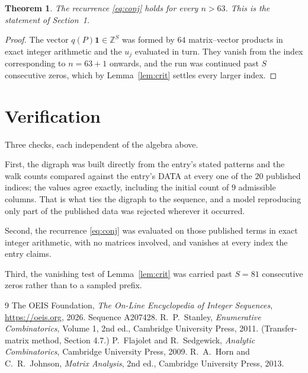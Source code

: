 \documentclass[11pt,a4paper]{article}
\theoremstyle{plain}
\newtheorem{theorem}{Theorem}
\theoremstyle{definition}
\begin{document}
\begin{theorem}
The recurrence \eqref{eq:conj} holds for every $n>63$. This is the statement of
Section~1.
\end{theorem}

\begin{proof}
The vector $q(P)\mathbf{1}\in\mathbb{Z}^{S}$ was formed by $64$ matrix--vector
products in exact integer arithmetic and the $u_j$ evaluated in turn. They vanish from the
index corresponding to $n=63+1$ onwards, and the run was continued past $S$ consecutive
zeros, which by Lemma~\ref{lem:crit} settles every larger index.
\end{proof}

\section{Verification}

Three checks, each independent of the algebra above.

First, the digraph was built directly from the entry's stated patterns and the walk counts
compared against the entry's DATA at every one of the $20$ published indices; the
values agree exactly, including the initial count of $9$ admissible columns. That is
what ties the digraph to the sequence, and a model reproducing only part of the published
data was rejected wherever it occurred.

Second, the recurrence \eqref{eq:conj} was evaluated on those published terms in exact
integer arithmetic, with no matrices involved, and vanishes at every index the entry claims.

Third, the vanishing test of Lemma~\ref{lem:crit} was carried past $S=81$ consecutive
zeros rather than to a sampled prefix.

\begin{thebibliography}{9}
 The OEIS Foundation, \emph{The On-Line Encyclopedia of Integer
Sequences}, \url{https://oeis.org}, 2026. Sequence A207428.
 R.~P.~Stanley, \emph{Enumerative Combinatorics}, Volume 1, 2nd ed.,
Cambridge University Press, 2011. (Transfer-matrix method, Section 4.7.)
 P.~Flajolet and R.~Sedgewick, \emph{Analytic Combinatorics}, Cambridge
University Press, 2009.
 R.~A.~Horn and C.~R.~Johnson, \emph{Matrix Analysis}, 2nd ed., Cambridge
University Press, 2013.
\end{thebibliography}
\end{document}

